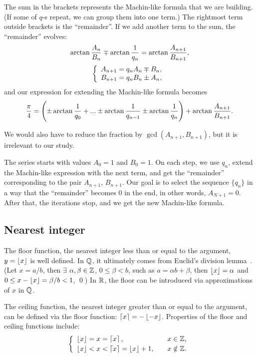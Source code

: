 \documentclass[draft, 10pt]{article} %
\begin{document}
The sum in the brackets represents the Machin-like formula that we are building.
(If some of $q$-s repeat, we can group them into one term.)
The rightmost term outside brackets is the ``remainder''. If we add another term to the sum,
the ``remainder'' evolves:
%
\begin{equation}\mlabel{evolve}
\begin{array}{c}
\arctan\dfrac{A_n}{B_n} \mp \arctan\dfrac{1}{q_n}
    = \arctan\dfrac{A_{n+1}}{B_{n+1}}, \\[1.2em]
\left\{\begin{array}{l}
A_{n+1} = q_n A_n \mp B_n, \strut \\
B_{n+1} = q_n B_n \pm A_n,
\end{array}\right.
\end{array}
\end{equation}
and our expression for extending the Machin-like formula becomes
$$
\dfrac{\pi}{4} =
    \left( \pm \arctan\dfrac{1}{q_0 \strut} + ... \pm \arctan\dfrac{1}{q_{n-1}}
        \pm \arctan\dfrac{1}{q_n} \right)
    + \arctan\dfrac{A_{n+1}}{B_{n+1}}.
$$

We would also have to reduce the fraction by $\gcd(A_{n+1}, B_{n+1})$,
but it is irrelevant to our study.

The series starts with values $A_0=1$ and $B_0=1$.
On each step, we use $q_n$, extend the Machin-like expression with the next term,
and get the ``remainder'' corresponding to the pair $A_{n+1}$, $B_{n+1}$.
Our goal is to select the sequence
$\{ q_n \}$ in a way that the ``remainder'' becomes $0$ in the end, in other words,
$A_{N+1}=0$. After that, the iterations stop, and we get the new Machin-like formula.

\subsection{Nearest integer}

The floor function, the nearest integer less than or equal to the argument,
$y=\nfloor{x}$ is well defined.
In $\Q$, it ultimately comes from Euclid's division lemma~\cite{carmichael}.
(Let $x=a/b$, then $\exists$ $\alpha, \beta \in \Z$,
$0 \le \beta < b$, such as $a=\alpha b + \beta$, then $\nfloor{x} = \alpha$ and
$0 \le x - \nfloor{x} = \beta/b < 1$, \qed)
In $\R$, the floor can be introduced via approximations of $x$ in $\Q$.

The ceiling function, the nearest integer greater than or equal to the argument, can be defined
via the floor function: $\nceil{x} = -\nfloor{-x}$.
Properties of the floor and ceiling functions include:~\cite{knuth}
%
\begin{equation}\mlabel{floorceil}
\left\{\begin{array}{ll}
\nfloor{x} = x = \nceil{x}, & x \in \Z, \\[0.2em]
\nfloor{x} < x < \nceil{x} = \nfloor{x} + 1, \quad & x \notin \Z.
\end{array}\right.
\end{equation}
\end{document}
